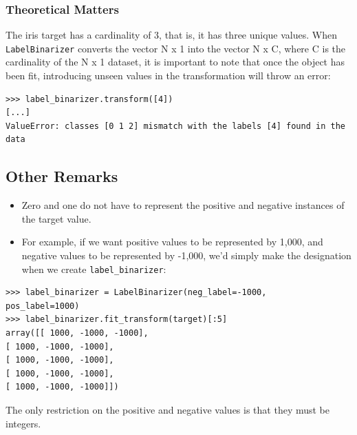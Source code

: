 \documentclass[SKL-MASTER.tex]{subfiles}
\begin{document}
\subsubsection*{Theoretical Matters}
The iris target has a cardinality of 3, that is, it has three unique values. When
\texttt{LabelBinarizer} converts the vector N x 1 into the vector N x C, where C is the
cardinality of the N x 1 dataset, it is important to note that once the object has been
fit, introducing unseen values in the transformation will throw an error:
\begin{framed}
\begin{verbatim}
>>> label_binarizer.transform([4])
[...]
ValueError: classes [0 1 2] mismatch with the labels [4] found in the
data
\end{verbatim}
\end{framed}
\subsection*{Other Remarks}
\begin{itemize}
\item Zero and one do not have to represent the positive and negative instances of the target
value. 
\item For example, if we want positive values to be represented by 1,000, and negative
values to be represented by -1,000, we'd simply make the designation when we create
\texttt{label\_binarizer}:
\end{itemize}

\begin{framed}
\begin{verbatim} 
>>> label_binarizer = LabelBinarizer(neg_label=-1000,
pos_label=1000)
>>> label_binarizer.fit_transform(target)[:5]
array([[ 1000, -1000, -1000],
[ 1000, -1000, -1000],
[ 1000, -1000, -1000],
[ 1000, -1000, -1000],
[ 1000, -1000, -1000]])
\end{verbatim}
\end{framed}
The only restriction on the positive and negative values
is that they must be integers.
\end{document}
